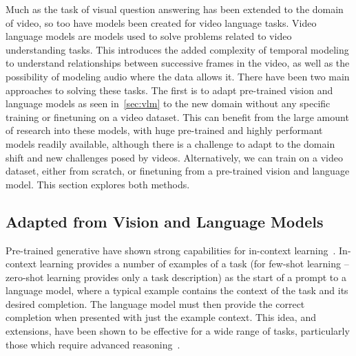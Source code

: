 Much as the task of visual question answering has been extended to the domain
of video, so too have models been created for video language tasks. Video
language models are models used to solve problems related to video
understanding tasks. This introduces the added complexity of temporal modeling
to understand relationships between successive frames in the video, as well as
the possibility of modeling audio where the data allows it. There have been two
main approaches to solving these tasks. The first is to adapt pre-trained vision
and language models as seen in~\cref{sec:vlm} to the new domain without any specific
training or finetuning on a video dataset. This can benefit from the large
amount of research into these models, with huge pre-trained and highly
performant models readily available, although there is a challenge to adapt to
the domain shift and new challenges posed by videos. Alternatively, we can
train on a video dataset, either from scratch, or finetuning from a pre-trained
vision and language model. This section explores both methods.

\subsection{Adapted from Vision and Language Models}
\label{ssec:adaptvlm}

Pre-trained generative  have shown strong capabilities for
in-context learning~\citep{brown2020gpt3}. In-context learning provides a
number of examples of a task (for few-shot learning -- zero-shot learning
provides only a task description) as the start of a prompt to a language model,
where a typical example contains the context of the task and its desired
completion.  The language model must then provide the correct completion when
presented with just the example context. This idea, and extensions, have been
shown to be effective for a wide range of tasks, particularly those which
require advanced reasoning~\citep{wei2022cot,kojima2022step}.

